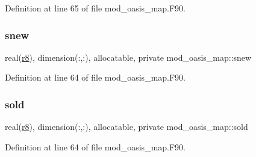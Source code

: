 Definition at line 65 of file mod\+\_\+oasis\+\_\+map.\+F90.

\mbox{\label{namespacemod__oasis__map_a28b59479c467c58995c6300071ca140a}} 
\subsubsection{\texorpdfstring{snew}{snew}}
{\footnotesize\ttfamily real(\hyperlink{namespacemod__oasis__map_a30ebe320b9e4c06a1ee1f2a0bbacf2c4}{r8}), dimension(\+:,\+:), allocatable, private mod\+\_\+oasis\+\_\+map\+::snew\hspace{0.3cm}{\ttfamily [private]}}



Definition at line 64 of file mod\+\_\+oasis\+\_\+map.\+F90.

\mbox{\label{namespacemod__oasis__map_a1fc7e7f295910352524d442c5d0dbf79}} 
\subsubsection{\texorpdfstring{sold}{sold}}
{\footnotesize\ttfamily real(\hyperlink{namespacemod__oasis__map_a30ebe320b9e4c06a1ee1f2a0bbacf2c4}{r8}), dimension(\+:,\+:), allocatable, private mod\+\_\+oasis\+\_\+map\+::sold\hspace{0.3cm}{\ttfamily [private]}}



Definition at line 64 of file mod\+\_\+oasis\+\_\+map.\+F90.

